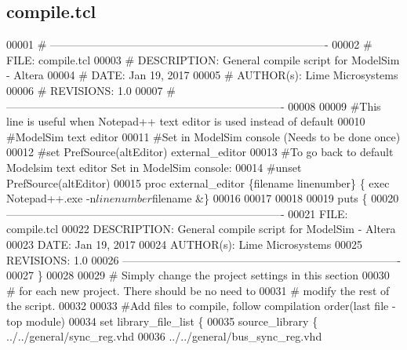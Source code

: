 \subsection{compile.\+tcl}
\label{tx__path__top_2fifo2diq_2compile_8tcl_source}

\begin{DoxyCode}
00001 \textcolor{comment}{# ---------------------------------------------------------------------------- }
00002 \textcolor{comment}{}\textcolor{comment}{# FILE:    compile.tcl}
00003 \textcolor{comment}{}\textcolor{comment}{# DESCRIPTION: General compile script for ModelSim - Altera}
00004 \textcolor{comment}{}\textcolor{comment}{# DATE:    Jan 19, 2017}
00005 \textcolor{comment}{}\textcolor{comment}{# AUTHOR(s):   Lime Microsystems}
00006 \textcolor{comment}{}\textcolor{comment}{# REVISIONS: 1.0}
00007 \textcolor{comment}{}\textcolor{comment}{# ----------------------------------------------------------------------------}
00008 \textcolor{comment}{}
00009 \textcolor{comment}{#This line is useful when Notepad++ text editor is used instead of default }
00010 \textcolor{comment}{}\textcolor{comment}{#ModelSim text editor}
00011 \textcolor{comment}{}\textcolor{comment}{#Set in ModelSim console (Needs to be done once)}
00012 \textcolor{comment}{}\textcolor{comment}{#set PrefSource(altEditor) external\_editor}
00013 \textcolor{comment}{}\textcolor{comment}{#To go back to default Modelsim text editor Set in ModelSim console:}
00014 \textcolor{comment}{}\textcolor{comment}{#unset PrefSource(altEditor)}
00015 \textcolor{comment}{}\textcolor{keyword}{proc} external\_editor \{filename linenumber\} \{ \textcolor{keyword}{exec} Notepad++.exe -n$linenumber $filename &\}\textcolor{comment}{}
00016 \textcolor{comment}{}
00017 
00018 
00019 \textcolor{keyword}{puts} \{
00020  ----------------------------------------------------------------------------  
00021  FILE:     compile.tcl
00022  DESCRIPTION:  General compile script for ModelSim - Altera
00023  DATE: Jan 19, 2017
00024  AUTHOR(s):    Lime Microsystems
00025  REVISIONS: 1.0
00026  ----------------------------------------------------------------------------
00027 \}\textcolor{comment}{}
00028 \textcolor{comment}{}
00029 \textcolor{comment}{# Simply change the project settings in this section}
00030 \textcolor{comment}{}\textcolor{comment}{# for each new project. There should be no need to}
00031 \textcolor{comment}{}\textcolor{comment}{# modify the rest of the script.}
00032 \textcolor{comment}{}
00033 \textcolor{comment}{#Add files to compile, follow compilation order(last file - top module)}
00034 \textcolor{comment}{}\textcolor{keyword}{set} library\_file\_list \{
00035                            source\_library \{ ../../general/sync\_reg.vhd
00036                                             ../../general/bus\_sync\_reg.vhd                            
                      

\end{DoxyCode}
